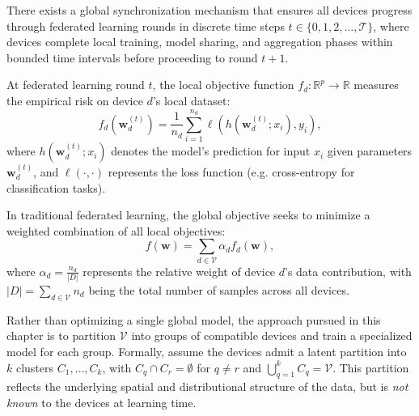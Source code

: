 \begin{assumption}\label{assumption:synchronized-fl-rounds}
There exists a global synchronization mechanism that ensures all devices 
 progress through federated learning rounds in discrete time steps $t \in \{0, 1, 2, \ldots, \mathcal{T}\}$, 
 where devices complete local training, model sharing, and aggregation phases 
 within bounded time intervals before proceeding to round $t+1$.
\end{assumption}
%
At federated learning round $t$, 
 the local objective function $f_d: \mathbb{R}^p \rightarrow \mathbb{R}$ measures the empirical risk 
 on device $d$'s local dataset:
%
\begin{equation}
f_d(\mathbf{w}_d^{(t)}) = \frac{1}{n_d} \sum_{i=1}^{n_d} \ell(h(\mathbf{w}_d^{(t)}; x_i), y_i),
\end{equation}
%
where $h(\mathbf{w}_d^{(t)}; x_i)$ denotes the model's prediction for input $x_i$ given parameters $\mathbf{w}_d^{(t)}$, 
 and $\ell(\cdot, \cdot)$ represents the loss function (e.g. cross-entropy for classification tasks).

In traditional federated learning, 
 the global objective seeks to minimize a weighted combination of all local objectives:
\begin{equation}
  f(\mathbf{w}) = \sum_{d \in \mathcal{V}} \alpha_d f_d(\mathbf{w}),
\end{equation}
%
where $\alpha_d = \frac{n_d}{|D|}$ represents the relative weight of device $d$'s data contribution, 
 with $|D| = \sum_{d \in \mathcal{V}} n_d$ being the total number of samples across all devices.

Rather than optimizing a single global model,
 the approach pursued in this chapter is to partition $\mathcal{V}$ into groups of compatible devices
 and train a specialized model for each group.
%
Formally, assume the devices admit a latent partition into $k$ clusters
 $C_1, \ldots, C_k$, with $C_q \cap C_r = \emptyset$ for $q \neq r$
 and $\bigcup_{q=1}^k C_q = \mathcal{V}$.
%
This partition reflects the underlying spatial and distributional structure of the data,
 but is \emph{not known} to the devices at learning time.

